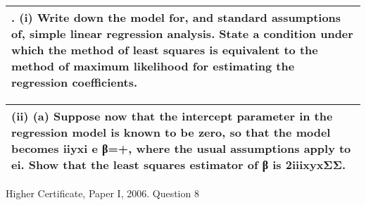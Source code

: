 \documentclass[a4paper,12pt]{article}
\begin{document}

\begin{table}[ht!]
     
\centering
     
\begin{tabular}{|p{15cm}|}
     
\hline        

\noindent
8. (i) Write down the model for, and standard assumptions of, simple linear regression analysis. 
State a condition under which the method of least squares is equivalent to the method of maximum likelihood for estimating the regression coefficients.
\\ \hline
      
\end{tabular}
    
\end{table}



\begin{table}[ht!]
     
\centering
     
\begin{tabular}{|p{15cm}|}
     
\hline        

\noindent

(ii) (a) Suppose now that the intercept parameter in the regression model is known to be zero, so that the model becomes
iiyxi e β=+,
where the usual assumptions apply to ei. Show that the least squares estimator of β is 2iiixyxΣΣ.
\\ \hline
      
\end{tabular}
    
\end{table}





Higher Certificate, Paper I, 2006. Question 8
\end{document}
